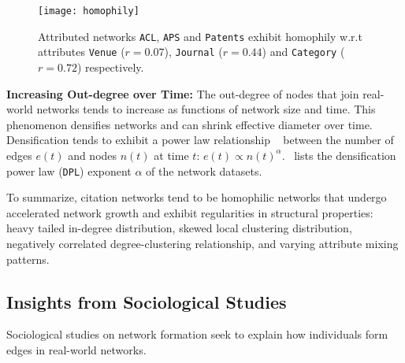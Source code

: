

\begin{figure}
 \centering
 \texttt{[image: homophily]}
 \caption{
    Attributed networks \texttt{ACL}, \texttt{APS} and \texttt{Patents} exhibit
    homophily w.r.t attributes \texttt{Venue} ($r=0.07$), \texttt{Journal} ($r=0.44$) and
    \texttt{Category} ($r=0.72$) respectively.
 }
 \label{fig:mixing}
 \vspace{-20pt}
\end{figure}



\textbf{Increasing Out-degree over Time:}
The out-degree of nodes that join real-world networks tends to increase as
functions of network size and time. This phenomenon densifies networks and
can shrink effective diameter over time. Densification tends to exhibit a power law
relationship ~\cite{leskovec2005graphs} between the number of edges $e(t)$ and
nodes $n(t)$ at time $t$: $e(t) \propto n(t)^{\alpha}$.~
lists the densification power law (\texttt{DPL}) exponent $\alpha$ of the
network datasets.

To summarize, citation networks tend to be homophilic networks that undergo
accelerated network growth and exhibit regularities in structural properties:
heavy tailed in-degree distribution, skewed local clustering distribution,
negatively correlated degree-clustering relationship, and varying attribute
mixing patterns.



\subsection{Insights from Sociological Studies}

Sociological studies on network formation seek to explain
how individuals form edges in real-world networks.

